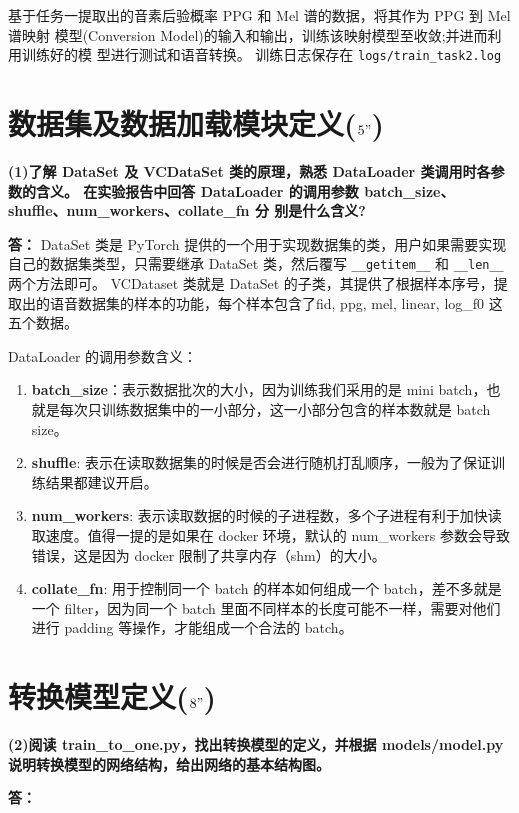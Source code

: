 \documentclass[degree=project,degree-type=project,cjk-font=noto]{thuthesis}
\begin{document}
基于任务一提取出的音素后验概率 PPG 和 Mel 谱的数据，将其作为 PPG 到 Mel 谱映射 模型(Conversion Model)的输入和输出，训练该映射模型至收敛;并进而利用训练好的模 型进行测试和语音转换。
训练日志保存在 \texttt{logs/train\_task2.log}

\section{数据集及数据加载模块定义($5"$)}

\textbf{(1)了解 DataSet 及 VCDataSet 类的原理，熟悉 DataLoader 类调用时各参数的含义。 在实验报告中回答 DataLoader 的调用参数 batch\_size、shuffle、num\_workers、collate\_fn 分 别是什么含义?}

\textbf{答：}
DataSet 类是 PyTorch 提供的一个用于实现数据集的类，用户如果需要实现自己的数据集类型，只需要继承 DataSet 类，然后覆写 \texttt{\_\_getitem\_\_} 和 \texttt{\_\_len\_\_} 两个方法即可。
VCDataset 类就是 DataSet 的子类，其提供了根据样本序号，提取出的语音数据集的样本的功能，每个样本包含了fid, ppg, mel, linear, log\_f0 这五个数据。

DataLoader 的调用参数含义：

\begin{enumerate}
	\item \textbf{batch\_size}：表示数据批次的大小，因为训练我们采用的是 mini batch，也就是每次只训练数据集中的一小部分，这一小部分包含的样本数就是 batch size。
	\item \textbf{shuffle}: 表示在读取数据集的时候是否会进行随机打乱顺序，一般为了保证训练结果都建议开启。
	\item \textbf{num\_workers}: 表示读取数据的时候的子进程数，多个子进程有利于加快读取速度。值得一提的是如果在 docker 环境，默认的 num\_workers 参数会导致错误，这是因为 docker 限制了共享内存（shm）的大小。
	\item \textbf{collate\_fn}: 用于控制同一个 batch 的样本如何组成一个 batch，差不多就是一个 filter，因为同一个 batch 里面不同样本的长度可能不一样，需要对他们进行 padding 等操作，才能组成一个合法的 batch。
\end{enumerate}

\section{转换模型定义($8"$)}

\textbf{(2)阅读 train\_to\_one.py，找出转换模型的定义，并根据 models/model.py 说明转换模型的网络结构，给出网络的基本结构图。}

\textbf{答：}
\end{document}
